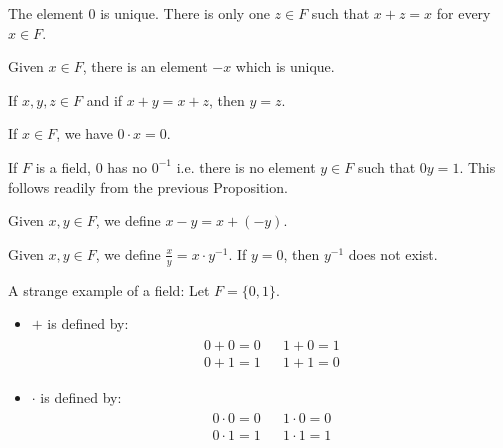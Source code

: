\begin{prop}
	The element $0$ is unique. There is only one $z \in F$ such that $x+z=x$ for 
	every $x \in F$.
\end{prop}


\begin{prop}
	Given $x \in F$, there is an element $-x$ which is unique.
\end{prop}


\begin{prop} 
	If $x,y,z \in F$ and if $x + y = x + z$, then $y=z$.
\end{prop}


\begin{prop}
	If $x \in F$, we have $0 \cdot x = 0$.
\end{prop}


\begin{corollary}
	If $F$ is a field, $0$ has no $0^{-1}$ i.e. there is no element $y \in F$ 
	such that $0y = 1$. This follows readily from the previous Proposition.
\end{corollary}


\begin{definition}
	Given $x,y \in F$, we define $x-y = x+(-y)$.
\end{definition}


\begin{definition}
	Given $x,y \in F$, we define $\frac{x}{y} = x \cdot y^{-1}$.  If $y = 0$, 
	then $y^{-1}$ does not exist.
\end{definition}


\begin{example}
	A strange example of a field: Let $F= \{ 0,1 \}$.

	\begin{itemize}
		\item $+$ is defined by:
			\begin{align*}
			\begin{array}{rcl}
  				0+0=0 & & 1+0=1 \\
  				0+1=1 & & 1+1=0 
  			\end{array}
  			\end{align*}

  		\item $\cdot$ is defined by:
	  		\begin{align*}
			\begin{array}{rcl}
  				0 \cdot 0=0 & & 1 \cdot 0=0 \\
  				0 \cdot 1=1 & & 1 \cdot 1=1
  			\end{array}
  			\end{align*}
  			
	\end{itemize}
\end{example}


